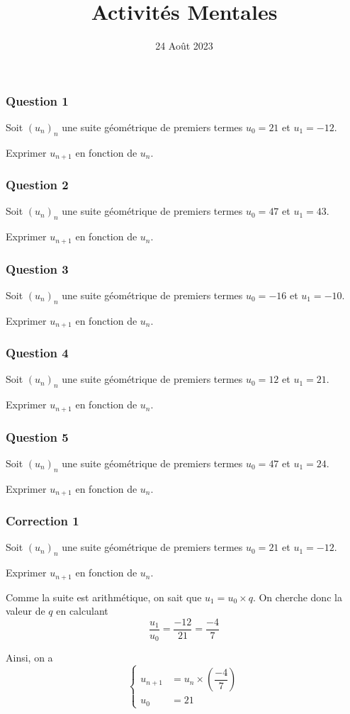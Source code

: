 \documentclass[15pt, mathserif]{beamer}
\title{Activités Mentales}
\date{24 Août 2023}
\begin{document}
\begin{frame}
    \titlepage
\end{frame}

\begin{frame} 
	\frametitle{Question 1}
Soit $(u_n)_n$ une suite géométrique de premiers termes $u_0=21$ et $u_1=-12$. 
 
 Exprimer $u_{n+1}$ en fonction de $u_n$.\end{frame}


\begin{frame} 
	\frametitle{Question 2}
Soit $(u_n)_n$ une suite géométrique de premiers termes $u_0=47$ et $u_1=43$. 
 
 Exprimer $u_{n+1}$ en fonction de $u_n$.\end{frame}


\begin{frame} 
	\frametitle{Question 3}
Soit $(u_n)_n$ une suite géométrique de premiers termes $u_0=-16$ et $u_1=-10$. 
 
 Exprimer $u_{n+1}$ en fonction de $u_n$.\end{frame}


\begin{frame} 
	\frametitle{Question 4}
Soit $(u_n)_n$ une suite géométrique de premiers termes $u_0=12$ et $u_1=21$. 
 
 Exprimer $u_{n+1}$ en fonction de $u_n$.\end{frame}


\begin{frame} 
	\frametitle{Question 5}
Soit $(u_n)_n$ une suite géométrique de premiers termes $u_0=47$ et $u_1=24$. 
 
 Exprimer $u_{n+1}$ en fonction de $u_n$.\end{frame}


\begin{frame}
\vspace{-10mm}
	\frametitle{Correction 1}
Soit $(u_n)_n$ une suite géométrique de premiers termes $u_0=21$ et $u_1=-12$. 
 
 Exprimer $u_{n+1}$ en fonction de $u_n$. 
 
 \vspace*{1cm} 
 
 Comme la suite est arithmétique, on sait que $u_1=u_0\times q$. On cherche donc la valeur de $q$ en calculant $$\dfrac{u_1}{u_0}=\dfrac{-12}{21}=\dfrac{-4}{7}$$ 
 
 Ainsi, on a $$ \left\{ 
 \begin{array}{ll} 
 u_{n+1} &= u_n \times \left( \dfrac{-4}{7} \right)  \\ 
 u_0 & = 21 
 \end{array} 
 \right. $$ 
 \end{frame}
\end{document}
